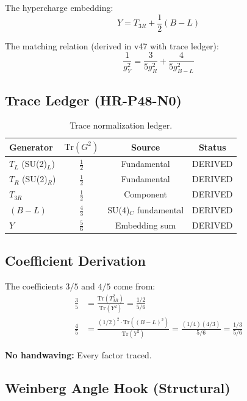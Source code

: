 \documentclass[11pt,a4paper]{article}
\begin{document}
The hypercharge embedding:
\begin{equation}
\label{eq:Y-embedding}
Y = T_{3R} + \frac{1}{2}(B-L)
\end{equation}

The matching relation (derived in v47 with trace ledger):
\begin{equation}
\label{eq:matching-relation}
\boxed{\frac{1}{g_Y^2} = \frac{3}{5 g_R^2} + \frac{4}{5 g_{B-L}^2}}
\end{equation}

\subsection{Trace Ledger (HR-P48-N0)}
\label{subsec:trace-ledger}

\begin{table}[ht]
\centering
\caption{Trace normalization ledger.}
\label{tab:trace-ledger}
\begin{tabular}{lccc}
\toprule
Generator & $\mathrm{Tr}(G^2)$ & Source & Status \\
\midrule
$T_L$ (SU(2)$_L$) & $\frac{1}{2}$ & Fundamental & DERIVED \\
$T_R$ (SU(2)$_R$) & $\frac{1}{2}$ & Fundamental & DERIVED \\
$T_{3R}$ & $\frac{1}{2}$ & Component & DERIVED \\
$(B-L)$ & $\frac{4}{3}$ & SU(4)$_C$ fundamental & DERIVED \\
$Y$ & $\frac{5}{6}$ & Embedding sum & DERIVED \\
\bottomrule
\end{tabular}
\end{table}

\subsection{Coefficient Derivation}
\label{subsec:coeff-derivation}

The coefficients $3/5$ and $4/5$ come from:
\begin{align}
\label{eq:coeff-3-5}
\frac{3}{5} &= \frac{\mathrm{Tr}(T_{3R}^2)}{\mathrm{Tr}(Y^2)} = \frac{1/2}{5/6} \\
\label{eq:coeff-4-5}
\frac{4}{5} &= \frac{(1/2)^2 \cdot \mathrm{Tr}((B-L)^2)}{\mathrm{Tr}(Y^2)} = \frac{(1/4)(4/3)}{5/6} = \frac{1/3}{5/6}
\end{align}

\textbf{No handwaving:} Every factor traced.

\subsection{Weinberg Angle Hook (Structural)}
\label{subsec:weinberg-hook}
\end{document}
